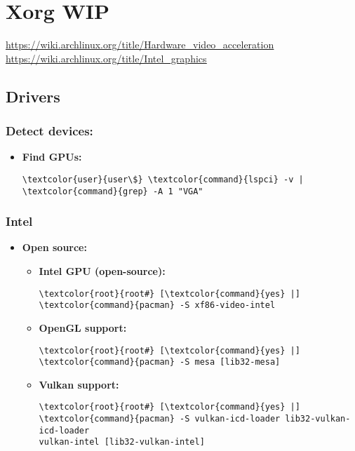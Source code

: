 \documentclass[10pt, a4paper, onecolumn, openany]{book} %
\begin{document}
\chapter{Xorg WIP}
\underline{\url{https://wiki.archlinux.org/title/Hardware_video_acceleration}}
\underline{\url{https://wiki.archlinux.org/title/Intel_graphics}}
\section{Drivers}
\subsection{Detect devices:}
\begin{itemize}
    \item \textbf{Find GPUs:}
\begin{Verbatim}[commandchars=\\\{\}]
\textcolor{user}{user\$} \textcolor{command}{lspci} -v | \textcolor{command}{grep} -A 1 "VGA"
\end{Verbatim}
\end{itemize}
\subsection{Intel}
    \begin{itemize}
        \item \textbf{Open source:}
\begin{itemize}
        \item \textbf{Intel GPU (open-source):}
\begin{Verbatim}[commandchars=\\\{\}]
\textcolor{root}{root#} [\textcolor{command}{yes} |] \textcolor{command}{pacman} -S xf86-video-intel
\end{Verbatim}
        \item \textbf{OpenGL support:}
\begin{Verbatim}[commandchars=\\\{\}]
\textcolor{root}{root#} [\textcolor{command}{yes} |] \textcolor{command}{pacman} -S mesa [lib32-mesa]
\end{Verbatim}
        \item \textbf{Vulkan support:}
\begin{Verbatim}[commandchars=\\\{\}]
\textcolor{root}{root#} [\textcolor{command}{yes} |] \textcolor{command}{pacman} -S vulkan-icd-loader lib32-vulkan-icd-loader 
vulkan-intel [lib32-vulkan-intel]
\end{Verbatim}
    \end{itemize}
\end{itemize}
\end{document}
